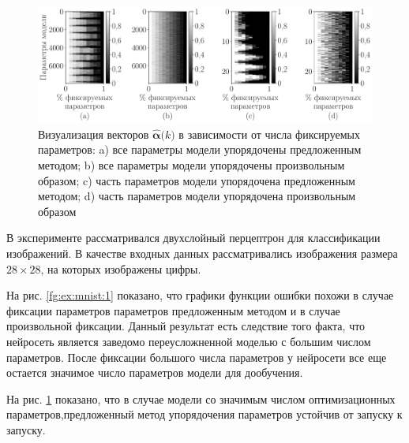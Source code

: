 \begin{figure}[h!t]\center
\includegraphics[width=1\textwidth]{results/order/mnist_data_matshow}
\caption{Визуализация векторов $\hat{\bm{\alpha}}\bigr(k\bigr)$ в зависимости от числа фиксируемых параметров: a) все параметры модели упорядочены предложенным методом; b) все параметры модели упорядочены произвольным образом; c) часть параметров модели упорядочена предложенным методом; d) часть параметров модели упорядочена произвольным образом}
\label{fg:ex:mnist:2}
\end{figure}

В эксперименте рассматривался двухслойный перцептрон для классификации изображений. В качестве входных данных рассматривались изображения размера $28\times28$, на которых изображены цифры. 

На рис. \ref{fg:ex:mnist:1} показано, что графики функции ошибки похожи в случае фиксации параметров параметров предложенным методом и в случае произвольной фиксации. Данный результат есть следствие того факта, что нейросеть является заведомо переусложненной моделью с большим числом параметров. После фиксации большого числа параметров у нейросети все еще остается значимое число параметров модели для дообучения.

На рис. \ref{fg:ex:mnist:2} показано, что в случае модели со значимым числом оптимизационных параметров,предложенный метод упорядочения параметров устойчив от запуску к запуску.

